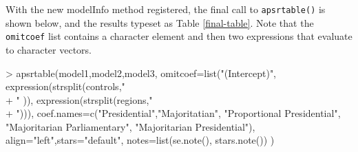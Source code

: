 \documentclass[10pt]{article} %
\begin{document}
With the new modelInfo method registered, the final call to \verb|apsrtable()| is shown below, and the results typeset as Table \ref{final-table}. Note that the \verb|omitcoef| list contains a character element and then two expressions that evaluate to character vectors.
\begin{Schunk}
\begin{Sinput}
> apsrtable(model1,model2,model3,
 omitcoef=list("(Intercept)", expression(strsplit(controls," \\+ " )), expression(strsplit(regions," \\+ "))),
 coef.names=c("Presidential","Majoritatian", 
   "Proportional Presidential", "Majoritarian Parliamentary", "Majoritarian Presidential"),
 align="left",stars="default",
 notes=list(se.note(), stars.note())
 )
\end{Sinput}
\end{Schunk}
\end{document}
